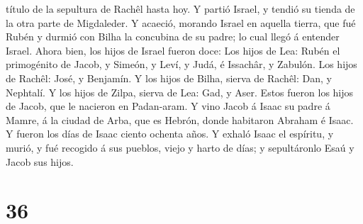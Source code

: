 título de la sepultura de Rachêl hasta hoy.  Y partió
Israel, y tendió su tienda de la otra parte de Migdaleder.
 Y acaeció, morando Israel en aquella tierra, que fué
Rubén y durmió con Bilha la concubina de su padre; lo cual llegó á
entender Israel. Ahora bien, los hijos de Israel fueron doce:
 Los hijos de Lea: Rubén el primogénito de Jacob, y
Simeón, y Leví, y Judá, é Issachâr, y Zabulón.  Los hijos
de Rachêl: José, y Benjamín.  Y los hijos de Bilha,
sierva de Rachêl: Dan, y Nephtalí.  Y los hijos de Zilpa,
sierva de Lea: Gad, y Aser. Estos fueron los hijos de Jacob, que le
nacieron en Padan-aram.  Y vino Jacob á Isaac su padre á
Mamre, á la ciudad de Arba, que es Hebrón, donde habitaron Abraham é
Isaac.  Y fueron los días de Isaac ciento ochenta años.
 Y exhaló Isaac el espíritu, y murió, y fué recogido á
sus pueblos, viejo y harto de días; y sepultáronlo Esaú y Jacob sus
hijos.

\hypertarget{section-35}{%
\section{36}\label{section-35}}

